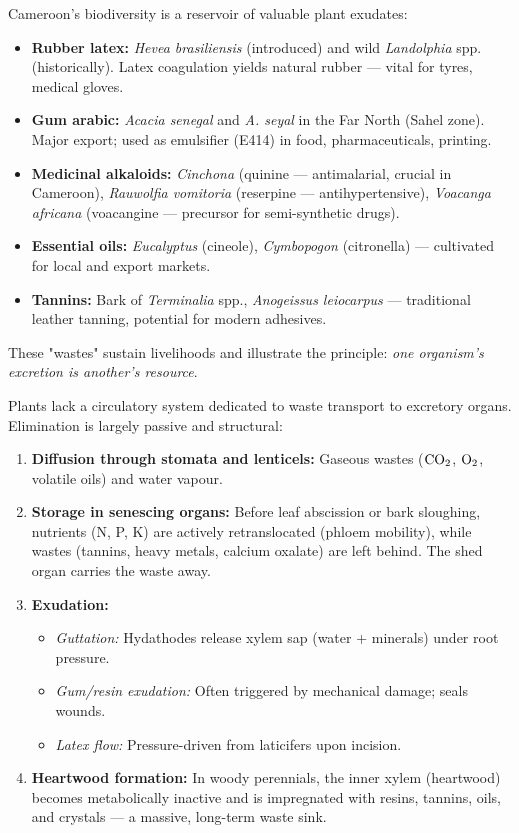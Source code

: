 \documentclass[11pt]{article}
\newcounter{popsec}
\newcounter{popsub}
\newcommand{\courssub}[1]{%
  \stepcounter{popsub}%
  \par\vspace{9pt}\noindent{\popxbold\fontsize{11.5}{13}\selectfont\color{popink}{\color{poporange}\thepopsec.\thepopsub}\hspace{6pt}#1}\par\nopagebreak\vspace{4pt}
}
\begin{document}
\begin{savaistu}
Cameroon's biodiversity is a reservoir of valuable plant exudates:
\begin{itemize}
\item \textbf{Rubber latex:} \emph{Hevea brasiliensis} (introduced) and wild \emph{Landolphia} spp. (historically). Latex coagulation yields natural rubber — vital for tyres, medical gloves.
\item \textbf{Gum arabic:} \emph{Acacia senegal} and \emph{A. seyal} in the Far North (Sahel zone). Major export; used as emulsifier (E414) in food, pharmaceuticals, printing.
\item \textbf{Medicinal alkaloids:} \emph{Cinchona} (quinine — antimalarial, crucial in Cameroon), \emph{Rauwolfia vomitoria} (reserpine — antihypertensive), \emph{Voacanga africana} (voacangine — precursor for semi-synthetic drugs).
\item \textbf{Essential oils:} \emph{Eucalyptus} (cineole), \emph{Cymbopogon} (citronella) — cultivated for local and export markets.
\item \textbf{Tannins:} Bark of \emph{Terminalia} spp., \emph{Anogeissus leiocarpus} — traditional leather tanning, potential for modern adhesives.
\end{itemize}
These "wastes" sustain livelihoods and illustrate the principle: \emph{one organism's excretion is another's resource}.
\end{savaistu}

\courssub{Methods of Elimination in Plants}

Plants lack a circulatory system dedicated to waste transport to excretory organs. Elimination is largely passive and structural:

\begin{enumerate}
\item \textbf{Diffusion through stomata and lenticels:} Gaseous wastes ($\ce{CO2}$, $\ce{O2}$, volatile oils) and water vapour.
\item \textbf{Storage in senescing organs:} Before leaf abscission or bark sloughing, nutrients (N, P, K) are actively retranslocated (phloem mobility), while wastes (tannins, heavy metals, calcium oxalate) are left behind. The shed organ carries the waste away.
\item \textbf{Exudation:}
\begin{itemize}
\item \emph{Guttation:} Hydathodes release xylem sap (water + minerals) under root pressure.
\item \emph{Gum/resin exudation:} Often triggered by mechanical damage; seals wounds.
\item \emph{Latex flow:} Pressure-driven from laticifers upon incision.
\end{itemize}
\item \textbf{Heartwood formation:} In woody perennials, the inner xylem (heartwood) becomes metabolically inactive and is impregnated with resins, tannins, oils, and crystals — a massive, long-term waste sink.
\end{enumerate}
\end{document}
